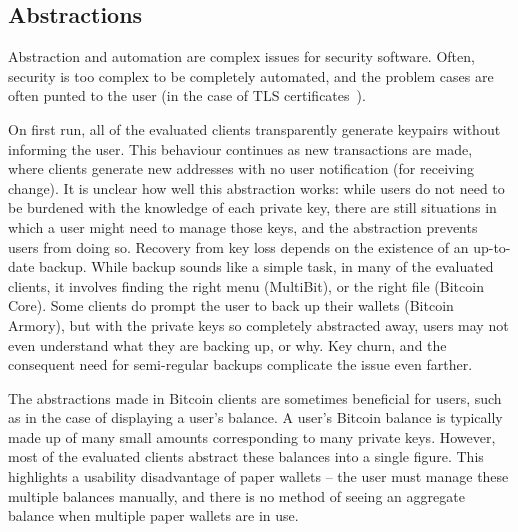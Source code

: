 
\subsection{Abstractions}

Abstraction and automation are complex issues for security software. Often, security is too complex to be completely automated, and the problem cases are often punted to the user (\eg in the case of TLS certificates~\cite{SSLSobey}).  

On first run, all of the evaluated clients transparently generate keypairs without informing the user. This behaviour continues as new transactions are made, where clients generate new addresses with no user notification (\eg for receiving change). It is unclear how well this abstraction works: while users do not need to be burdened with the knowledge of each private key, there are still situations in which a user might need to manage those keys, and the abstraction prevents users from doing so. Recovery from key loss depends on the existence of an up-to-date backup. While backup sounds like a simple task, in many of the evaluated clients, it involves finding the right menu (MultiBit), or the right file (Bitcoin Core). Some clients do prompt the user to back up their wallets (\eg Bitcoin Armory), but with the private keys so completely abstracted away, users may not even understand what they are backing up, or why. Key churn, and the consequent need for semi-regular backups complicate the issue even farther. %

The abstractions made in Bitcoin clients are sometimes beneficial for users, such as in the case of displaying a user's balance. A user's Bitcoin balance is typically made up of many small amounts corresponding to many private keys. However, most of the evaluated clients abstract these balances into a single figure. This highlights a usability disadvantage of paper wallets -- the user must manage these multiple balances manually, and there is no method of seeing an aggregate balance when multiple paper wallets are in use.

